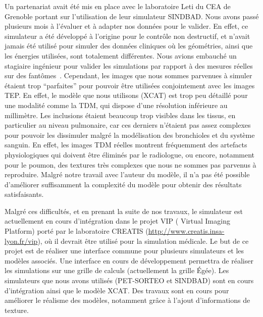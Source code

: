 Un partenariat avait été mis en place avec le laboratoire Leti du CEA de
Grenoble portant sur l'utilisation de leur simulateur SINDBAD. Nous avons passé
plusieurs mois à l'évaluer et à adapter nos données pour le valider. En effet, ce simulateur
 a été développé à l'origine pour le contrôle non destructif, et n'avait
jamais été utilisé pour simuler des données cliniques où les géométries, ainsi
que les énergies utilisées, sont totalement différentes. Nous avions embauché un
stagiaire ingénieur pour valider les simulations par rapport à des mesures
réelles sur des fantômes~\cite{leduvehat}. Cependant, les images que nous sommes parvenues à simuler étaient trop
``parfaites'' pour pouvoir être utilisées conjointement avec les images TEP. En
effet, le modèle que nous utilisons (XCAT) est trop peu détaillé pour une
modalité comme la TDM, qui dispose d'une résolution inférieure au millimètre. Les
inclusions étaient beaucoup trop visibles dans les tissus, en particulier
au niveau pulmonaire, car ces derniers n'étaient pas assez complexes pour
pouvoir les dissimuler malgré la modélisation des bronchioles et du système
sanguin. En effet, les images TDM réelles montrent fréquemment des artefacts
physiologiques qui doivent être éliminés par le radiologue, ou encore,
notamment pour le poumon, des textures très complexes que nous ne sommes pas
parvenus à reproduire. Malgré notre travail avec l'auteur du modèle, il n'a pas
été possible d'améliorer suffisamment la complexité du modèle pour obtenir des
résultats satisfaisants. 

Malgré ces difficultés, et en prenant la suite de nos travaux, le simulateur est
actuellement en cours d'intégration dans le projet  VIP ( Virtual Imaging Platform) porté par le laboratoire CREATIS (\url{http://www.creatis.insa-lyon.fr/vip}), où il devrait être
utilisé pour la simulation médicale. Le but de ce projet est de réaliser
une interface commune pour plusieurs simulateurs et les modèles associés. Une
interface en cours de développement permettra de réaliser les simulations sur
une grille de calculs (actuellement la grille Égée). Les simulateurs que nous
avons utilisés (PET-SORTEO et SINDBAD) sont en cours d'intégration ainsi
que le modèle XCAT. Des travaux sont en cours pour améliorer le réalisme des
modèles, notamment grâce à l'ajout d'informations de texture.  



